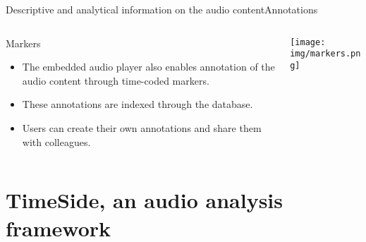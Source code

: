 \documentclass[final, hyperref, table]{beamer}
\begin{document}
\begin{frame}{Descriptive and analytical information on the audio content}{Annotations}%
  \begin{columns}[T]
    \begin{column}{0.6\textwidth}
      \begin{block}{Markers}%
        \begin{itemize}
        \item The embedded audio player also enables annotation of the
          audio content through \alert{time-coded markers}.
        \item These annotations are \alert{indexed through the database}.

        \item Users can create their own annotations and \alert{share} them with colleagues.
   
        \end{itemize}

      \end{block}
    \end{column}

    \begin{column}{0.4\textwidth}
      \texttt{[image: img/markers.png]}
    \end{column}
  \end{columns}
\end{frame}

\section[TimeSide]{TimeSide, an audio analysis framework}\label{sec:TimeSide}
\end{document}
